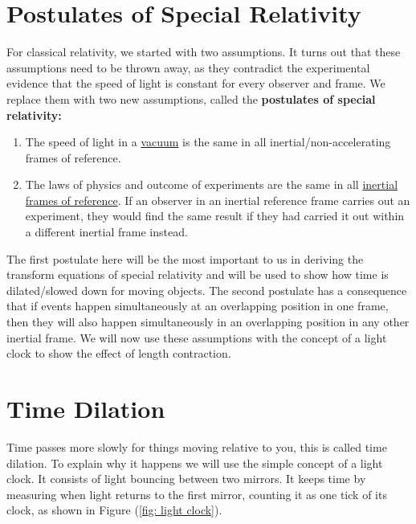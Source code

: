 \section{Postulates of Special Relativity} \label{sect: Postulates of Special Relativity}

For classical relativity, we started with two assumptions. It turns out that these assumptions need to be thrown away, as they contradict the experimental evidence that the speed of light is constant for every observer and frame. We replace them with two new assumptions, called the \textbf{postulates of special relativity:}

\begin{tcolorbox}%
	\begin{enumerate}
		\item The speed of light in a \hyperlink{def-vacuum}{vacuum} is the same in all inertial/non-accelerating frames of reference.
		\item The laws of physics and outcome of experiments are the same in all \hyperlink{def-Inertial-reference-frame}{inertial frames of reference}. If an observer in an inertial reference frame carries out an experiment, they would find the same result if they had carried it out within a different inertial frame instead.
	\end{enumerate}
\end{tcolorbox}

The first postulate here will be the most important to us in deriving the transform equations of special relativity and will be used to show how time is dilated/slowed down for moving objects. The second postulate has a consequence that if events happen simultaneously at an overlapping position in one frame, then they will also happen simultaneously in an overlapping position in any other inertial frame.
We will now use these assumptions with the concept of a light clock to show the effect of length contraction.

\section{Time Dilation} \label{sect: Time Dilation}

Time passes more slowly for things moving relative to you, this is called time dilation.
To explain why it happens we will use the simple concept of a light clock.
It consists of light bouncing between two mirrors.
It keeps time by measuring when light returns to the first mirror, counting it as one tick of its clock, as shown in Figure (\ref{fig: light clock}).

